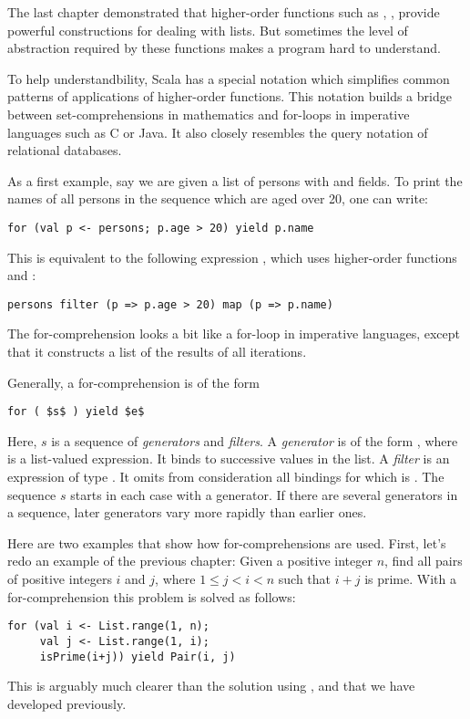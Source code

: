 The last chapter demonstrated that higher-order functions such as
\verb@map@, \verb@flatMap@, \verb@filter@ provide powerful
constructions for dealing with lists.  But sometimes the level of
abstraction required by these functions makes a program hard to
understand.

To help understandbility, Scala has a special notation which
simplifies common patterns of applications of higher-order functions.
This notation builds a bridge between set-comprehensions in
mathematics and for-loops in imperative languages such as C or
Java. It also closely resembles the query notation of relational
databases.

As a first example, say we are given a list  of persons
with  and  fields.  To print the names of all
persons in the sequence which are aged over 20, one can write:
\begin{lstlisting}
for (val p <- persons; p.age > 20) yield p.name
\end{lstlisting}
This is equivalent to the following expression , which uses
higher-order functions  and :
\begin{lstlisting}
persons filter (p => p.age > 20) map (p => p.name)
\end{lstlisting}
The for-comprehension looks a bit like a for-loop in imperative languages,
except that it constructs a list of the results of all iterations.

Generally, a for-comprehension is of the form
\begin{lstlisting}
for ( $s$ ) yield $e$
\end{lstlisting}
Here, $s$ is a sequence of {\em generators} and {\em filters}.  A {\em
generator} is of the form , where  is a
list-valued expression. It binds  to successive values in the
list.  A {\em filter} is an expression  of type
.  It omits from consideration all bindings for which
 is .  The sequence $s$ starts in each case with a
generator.  If there are several generators in a sequence, later
generators vary more rapidly than earlier ones.

Here are two examples that show how for-comprehensions are used.
First, let's redo an example of the previous chapter: Given a positive
integer $n$, find all pairs of positive integers $i$ and $j$, where $1
\leq j < i < n$ such that $i + j$ is prime. With a for-comprehension
this problem is solved as follows:
\begin{lstlisting}
for (val i <- List.range(1, n);
     val j <- List.range(1, i);
     isPrime(i+j)) yield Pair(i, j)
\end{lstlisting}
This is arguably much clearer than the solution using ,
 and  that we have developed previously.

